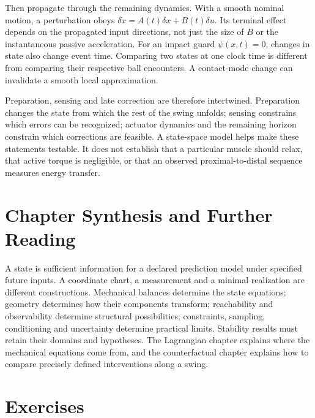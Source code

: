 Then propagate through the remaining dynamics. With a smooth nominal motion, a perturbation obeys $\delta\dot x=A(t)\delta x+B(t)\delta u$. Its terminal effect depends on the propagated input directions, not just the size of $B$ or the instantaneous passive acceleration. For an impact guard $\psi(x,t)=0$, changes in state also change event time. Comparing two states at one clock time is different from comparing their respective ball encounters. A contact-mode change can invalidate a smooth local approximation.

Preparation, sensing and late correction are therefore intertwined. Preparation changes the state from which the rest of the swing unfolds; sensing constrains which errors can be recognized; actuator dynamics and the remaining horizon constrain which corrections are feasible. A state-space model helps make these statements testable. It does not establish that a particular muscle should relax, that active torque is negligible, or that an observed proximal-to-distal sequence measures energy transfer.

\section{Chapter Synthesis and Further Reading}
\label{sec:summary}
\label{pr:summary_principle}
\label{sec:ch2_further_reading}

A state is sufficient information for a declared prediction model under specified future inputs. A coordinate chart, a measurement and a minimal realization are different constructions. Mechanical balances determine the state equations; geometry determines how their components transform; reachability and observability determine structural possibilities; constraints, sampling, conditioning and uncertainty determine practical limits. Stability results must retain their domains and hypotheses. The Lagrangian chapter explains where the mechanical equations come from, and the counterfactual chapter explains how to compare precisely defined interventions along a swing.

\section{Exercises}
\label{sec:ch2_exercises}

